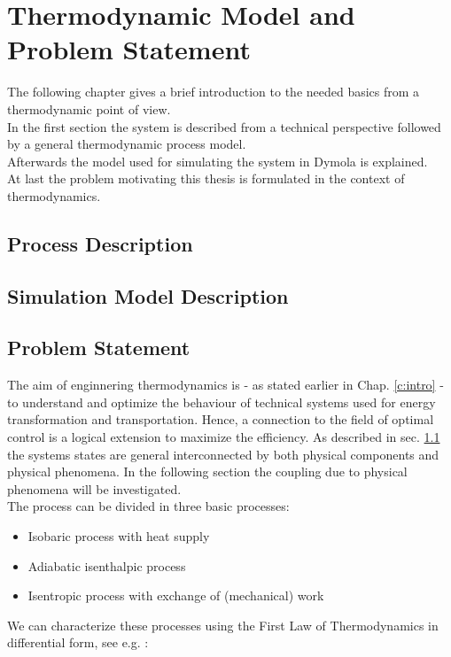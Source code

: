 \chapter{Thermodynamic Model and\\ Problem Statement}\label{c:thermo}

The following chapter gives a brief introduction to the needed basics from a thermodynamic point of view.\\

In the first section the system is described from a technical perspective followed by  a general thermodynamic process model. \\

Afterwards the model used for simulating the system in Dymola is explained. \\

At last the problem motivating this thesis is formulated in the context of thermodynamics.


\section{Process Description} \label{c:thermo:s:process}

\section{Simulation Model Description} \label{c:thermo:s:sim}

\section{Problem Statement} \label{c:thermo:problem}
The aim of enginnering thermodynamics is - as stated earlier in Chap. \ref{c:intro} - to understand and optimize the  behaviour of technical systems used for energy transformation and transportation. Hence, a connection to the field of optimal control is a logical extension to maximize the efficiency. As described in sec. \ref{c:thermo:s:process} the systems states are general interconnected by both physical components and physical phenomena. In the following section the coupling due to physical phenomena will be investigated.\\

The process can be divided in three basic processes:
\begin{itemize}
\item Isobaric process with heat supply
\item Adiabatic isenthalpic process 
\item Isentropic process with exchange of (mechanical) work
\end{itemize}
We can characterize these processes using the First Law of Thermodynamics in differential form, see e.g. \cite[p.25]{Weigand2013ThermodynamikKompakt}:

